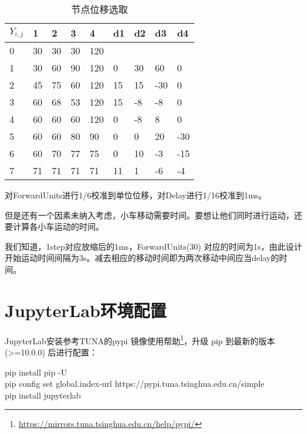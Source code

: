 \begin{table}[htbp]
    \centering
    \begin{tabular}{|l|l|l|l|l|l|l|l|l|}
    \hline
    $Y_{i,j}$
      & 1  & 2  & 3  & 4   & d1 & d2 & d3  & d4  \\ \hline
    0 & 30 & 30 & 30 & 120 &    &    &     &     \\ \hline
    1 & 30 & 60 & 90 & 120 & 0  & 30 & 60  & 0   \\ \hline
    2 & 45 & 75 & 60 & 120 & 15 & 15 & -30 & 0   \\ \hline
    3 & 60 & 68 & 53 & 120 & 15 & -8 & -8  & 0   \\ \hline
    4 & 60 & 60 & 60 & 120 & 0  & -8 & 8   & 0   \\ \hline
    5 & 60 & 60 & 80 & 90  & 0  & 0  & 20  & -30 \\ \hline
    6 & 60 & 70 & 77 & 75  & 0  & 10 & -3  & -15 \\ \hline
    7 & 71 & 71 & 71 & 71  & 11 & 1  & -6  & -4  \\ \hline
    \end{tabular}
    \caption{节点位移选取}
    \label{tab:UIDemoDesignSelection}
\end{table}

对ForwardUnits进行1/6校准到单位位移，对Delay进行1/16校准到1ms。

但是还有一个因素未纳入考虑，小车移动需要时间。要想让他们同时进行运动，还要计算各小车运动的时间。

我们知道，1step对应放缩后的1ms，ForwardUnits(30) 对应的时间为1s，由此设计开始运动时间间隔为3s。减去相应的移动时间即为两次移动中间应当delay的时间。


\section{JupyterLab环境配置}


JupyterLab安装参考TUNA的pypi 镜像使用帮助\footnote{\url{https://mirrors.tuna.tsinghua.edu.cn/help/pypi/}}，升级 pip 到最新的版本 (>=10.0.0) 后进行配置：

\begin{tcolorbox}
    pip install pip -U \\
    pip config set global.index-url https://pypi.tuna.tsinghua.edu.cn/simple \\
    pip install jupyterlab
\end{tcolorbox}

